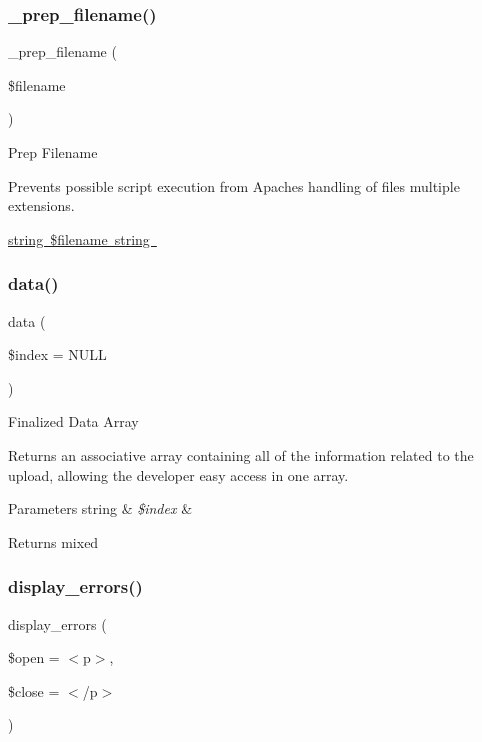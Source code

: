 \subsubsection{\texorpdfstring{\+\_\+prep\+\_\+filename()}{\_prep\_filename()}}
{\footnotesize\ttfamily \+\_\+prep\+\_\+filename (\begin{DoxyParamCaption}\item[{}]{\$filename }\end{DoxyParamCaption})\hspace{0.3cm}{\ttfamily [protected]}}

Prep Filename

Prevents possible script execution from Apache\textquotesingle{}s handling of files\textquotesingle{} multiple extensions.

\mbox{\hyperlink{}{string \$filename  string }}\mbox{\label{class_c_i___upload_afe56c7645362202d2f1c7b8f7da67f39}} 
\subsubsection{\texorpdfstring{data()}{data()}}
{\footnotesize\ttfamily data (\begin{DoxyParamCaption}\item[{}]{\$index = {\ttfamily NULL} }\end{DoxyParamCaption})}

Finalized Data Array

Returns an associative array containing all of the information related to the upload, allowing the developer easy access in one array.


\begin{DoxyParams}[1]{Parameters}
string & {\em \$index} & \\
\hline
\end{DoxyParams}
\begin{DoxyReturn}{Returns}
mixed 
\end{DoxyReturn}
\mbox{\label{class_c_i___upload_a71a6f2e6d97ff5347257f101002bc903}} 
\subsubsection{\texorpdfstring{display\+\_\+errors()}{display\_errors()}}
{\footnotesize\ttfamily display\+\_\+errors (\begin{DoxyParamCaption}\item[{}]{\$open = {\ttfamily \textquotesingle{}$<$p$>$\textquotesingle{}},  }\item[{}]{\$close = {\ttfamily \textquotesingle{}$<$/p$>$\textquotesingle{}} }\end{DoxyParamCaption})}

